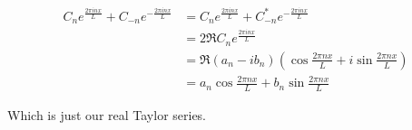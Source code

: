 \documentclass[11pt]{amsart}
\begin{document}
\begin{align*}
  C_n e^{\frac{2\pi inx}{L}} + C_{-n}e^{-\frac{2\pi inx}{L}} &= C_n e^{\frac{2\pi inx}{L}} + C^*_{-n}e^{-\frac{2\pi inx}{L}} \\
                                                             &= 2\Re{C_n e^{\frac{2\pi inx}{L}}} \\
                                                             &= \Re{(a_n - ib_n)\left(\cos{\frac{2\pi nx}{L}} + i\sin{\frac{2\pi nx}{L}}\right)} \\
                                                             &= a_n\cos{\frac{2\pi nx}{L}} + b_n\sin{\frac{2\pi nx}{L}}
\end{align*}

Which is just our real Taylor series.
\end{document}
